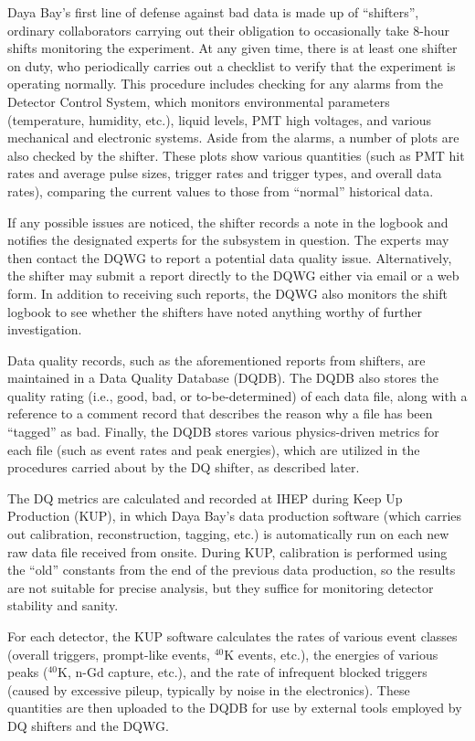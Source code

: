 \documentclass[../thesis.tex]{subfiles}
\begin{document}
Daya Bay's first line of defense against bad data is made up of ``shifters'', ordinary collaborators carrying out their obligation to occasionally take 8-hour shifts monitoring the experiment. At any given time, there is at least one shifter on duty, who periodically carries out a checklist to verify that the experiment is operating normally. This procedure includes checking for any alarms from the Detector Control System, which monitors environmental parameters (temperature, humidity, etc.), liquid levels, PMT high voltages, and various mechanical and electronic systems. Aside from the alarms, a number of plots are also checked by the shifter. These plots show various quantities (such as PMT hit rates and average pulse sizes, trigger rates and trigger types, and overall data rates), comparing the current values to those from ``normal'' historical data.

If any possible issues are noticed, the shifter records a note in the logbook and notifies the designated experts for the subsystem in question. The experts may then contact the DQWG to report a potential data quality issue. Alternatively, the shifter may submit a report directly to the DQWG either via email or a web form. In addition to receiving such reports, the DQWG also monitors the shift logbook to see whether the shifters have noted anything worthy of further investigation.

Data quality records, such as the aforementioned reports from shifters, are maintained in a Data Quality Database (DQDB). The DQDB also stores the quality rating (i.e., good, bad, or to-be-determined) of each data file, along with a reference to a comment record that describes the reason why a file has been ``tagged'' as bad. Finally, the DQDB stores various physics-driven metrics for each file (such as event rates and peak energies), which are utilized in the procedures carried about by the DQ shifter, as described later.

The DQ metrics are calculated and recorded at IHEP during Keep Up Production (KUP), in which Daya Bay's data production software (which carries out calibration, reconstruction, tagging, etc.) is automatically run on each new raw data file received from onsite. During KUP, calibration is performed using the ``old'' constants from the end of the previous data production, so the results are not suitable for precise analysis, but they suffice for monitoring detector stability and sanity.

For each detector, the KUP software calculates the rates of various event classes (overall triggers, prompt-like events, $^{40}$K events, etc.), the energies of various peaks ($^{40}$K, n-Gd capture, etc.), and the rate of infrequent blocked triggers (caused by excessive pileup, typically by noise in the electronics). These quantities are then uploaded to the DQDB for use by external tools employed by DQ shifters and the DQWG.
\end{document}
